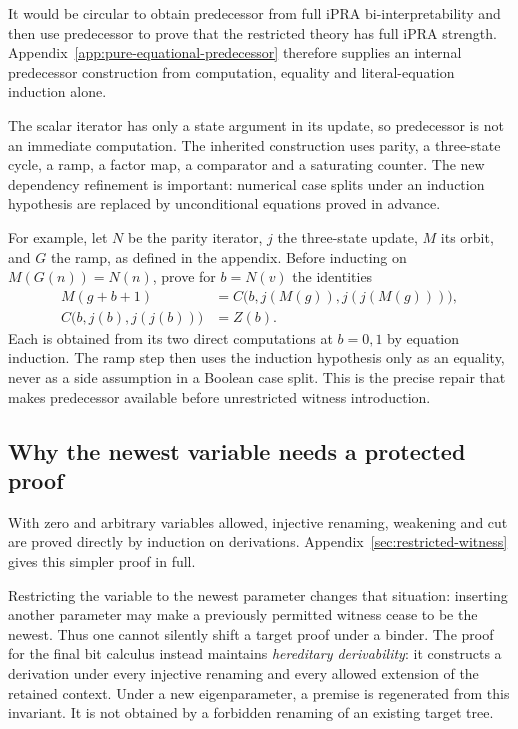 \documentclass[11pt,letterpaper]{article}
\theoremstyle{definition}
\theoremstyle{remark}
\newcommand{\IPRA}{\mathrm{iPRA}}
\begin{document}
It would be circular to obtain predecessor from full $\IPRA$
bi-interpretability and then use predecessor to prove that the restricted
theory has full $\IPRA$ strength. Appendix~\ref{app:pure-equational-predecessor}
therefore supplies an internal predecessor construction from computation,
equality and literal-equation induction alone.

The scalar iterator has only a state argument in its update, so predecessor
is not an immediate computation. The inherited construction uses parity,
a three-state cycle, a ramp, a factor map, a comparator and a saturating
counter. The new dependency refinement is important: numerical case
splits under an induction hypothesis are replaced by unconditional
equations proved in advance.

For example, let $N$ be the parity iterator, $j$ the three-state update,
$M$ its orbit, and $G$ the ramp, as defined in the appendix. Before
inducting on $M(G(n))=N(n)$, prove for $b=N(v)$ the identities
\begin{align*}
 M(g+b+1)&=C\bigl(b,j(M(g)),j(j(M(g)))\bigr),\\
 C\bigl(b,j(b),j(j(b))\bigr)&=Z(b).
\end{align*}
Each is obtained from its two direct computations at $b=0,1$ by
equation induction. The ramp step then uses the induction hypothesis
only as an equality, never as a side assumption in a Boolean case split.
This is the precise repair that makes predecessor available before
unrestricted witness introduction.

\subsection{Why the newest variable needs a protected proof}

With zero and arbitrary variables allowed, injective renaming,
weakening and cut are proved directly by induction on derivations.
Appendix~\ref{sec:restricted-witness} gives this simpler proof in full.

Restricting the variable to the newest parameter changes that situation:
inserting another parameter may make a previously permitted witness
cease to be the newest. Thus one cannot silently shift a target proof
under a binder. The proof for the final bit calculus instead maintains
\emph{hereditary derivability}: it constructs a derivation under every
injective renaming and every allowed extension of the retained context.
Under a new eigenparameter, a premise is regenerated from this invariant.
It is not obtained by a forbidden renaming of an existing target tree.
\end{document}
